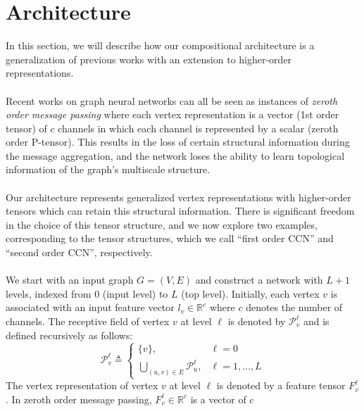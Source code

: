 \documentclass[sigchi]{acmart}
\theoremstyle{definition}
\theoremstyle{theorem}
\theoremstyle{corollary}
\theoremstyle{lemma}
\theoremstyle{remark}
\theoremstyle{prop}
\begin{document}
\section{Architecture}
\label{section:Architecture}

In this section, we will describe how our compositional architecture is a generalization of previous works with an extension to higher-order representations. \\ \\
Recent works on graph neural networks \cite{Duvenaud2015,KipfWelling2017,LiZemel2015,Gilmer2017} can all be seen as instances of \textit{zeroth order message passing} where each vertex representation is a vector (1st order tensor) of $c$ channels in which each channel is represented by a scalar (zeroth order P-tensor). This results in the loss of certain structural information during the message aggregation, and the network loses the ability to learn topological information of the graph's multiscale structure. \\ \\
Our architecture represents generalized vertex representations with higher-order tensors which can retain this structural information. There is significant freedom in the choice of this tensor structure, and we now explore two examples, corresponding to the tensor structures, which we call ``first order CCN'' and ``second order CCN'', respectively. \\ \\
We start with an input graph $G = (V, E)$ and construct a network with $L + 1$ levels, indexed from $0$ (input level) to $L$ (top level). Initially, each vertex $v$ is associated with an input feature vector $l_v \in \mathbb{R}^c$ where $c$ denotes the number of channels. The receptive field of vertex $v$ at level $\ell$ is denoted by $\mathcal{P}_v^\ell$ and is defined recursively as follows:
\begin{equation}
\mathcal{P}_v^\ell \triangleq \begin{cases} \{v\}, & \ell = 0 \\ \bigcup\limits_{(u, v) \in E} \mathcal{P}_u^\ell, & \ell = 1, \ldots, L \end{cases}
\end{equation}
The vertex representation of vertex $v$ at level $\ell$ is denoted by a feature tensor $F_v^\ell$. In zeroth order message passing, $F_v^{\ell} \in \mathbb{R}^c$ is a vector of $c$
\end{document}
